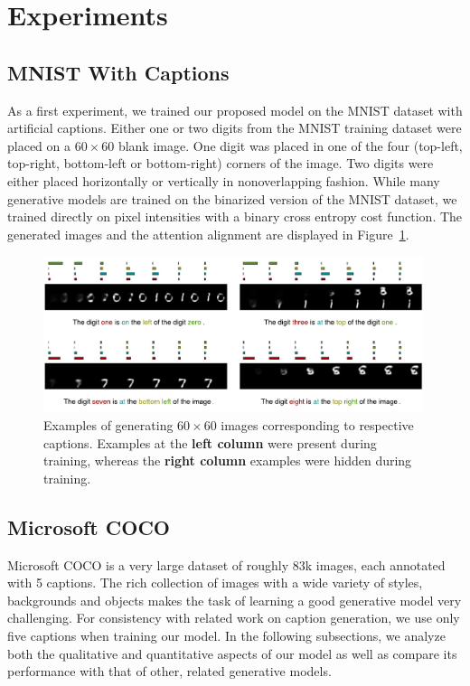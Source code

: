 \documentclass{article} %
\begin{document}
\section{Experiments}
\subsection{MNIST With Captions}
As a first experiment, we trained our proposed model on the MNIST dataset with artificial captions. Either one or two digits from the MNIST training dataset were placed on a $60 \times 60$ blank image. One digit was placed in one of the four (top-left, top-right, bottom-left or bottom-right) corners of the image. Two digits were either placed horizontally or vertically in nonoverlapping fashion. 
While many generative models are trained on the binarized version of the MNIST dataset, we trained directly on pixel intensities with a binary cross entropy cost function. 
The generated images and the attention alignment are displayed in Figure~\ref{fig:figmnist}.

\begin{figure}[!t]
\captionsetup[subfigure]{labelformat=empty}
\begin{center}
\includegraphics[width=0.99\textwidth]{figures/new/mnist/test3.pdf}\quad
%
\end{center}
\caption{Examples of generating $60 \times 60$ images corresponding to respective captions. Examples at the \textbf{left column} were present during training, whereas the \textbf{right column} examples were hidden during training.}
\label{fig:figmnist}
\vspace{-0.3cm}
\end{figure}

\subsection{Microsoft COCO}

Microsoft COCO \citep{mscoco} is a very large dataset of roughly 83k images, each annotated with 5 captions. The rich collection of images with a wide variety of styles, backgrounds and objects makes the task of learning a good generative model 
very challenging. For consistency with related work on caption generation, we use only five captions when training our model. In the following subsections, we analyze both the qualitative and quantitative aspects of our model as well as compare its performance with that of other, related generative models.
\end{document}

